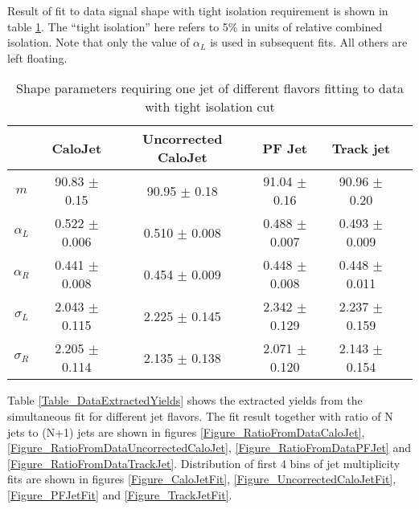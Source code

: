 \documentclass{cmspaper}
\begin{document}

Result of fit to data signal shape with tight isolation requirement is shown in table \ref{Table_DataAlphaL}.
The ``tight isolation'' here refers to 5\% in units of relative combined isolation.
Note that only the value of $\alpha_L$ is used in subsequent fits.  All others are left floating.

\begin{table}[htbp]
\caption{Shape parameters requiring one jet of different flavors fitting to data with tight isolation cut}
\centering
   \begin{tabular}{|c|c|c|c|c|c|}
      \hline
      & CaloJet & Uncorrected CaloJet & PF Jet & Track jet \\\hline
      $m$ & 90.83 $\pm$ 0.15 & 90.95 $\pm$ 0.18 & 91.04 $\pm$ 0.16 & 90.96 $\pm$ 0.20 \\\hline
      $\alpha_L$ & 0.522 $\pm$ 0.006 & 0.510 $\pm$ 0.008 & 0.488 $\pm$ 0.007 & 0.493 $\pm$ 0.009 \\\hline
      $\alpha_R$ & 0.441 $\pm$ 0.008 & 0.454 $\pm$ 0.009 & 0.448 $\pm$ 0.008 & 0.448 $\pm$ 0.011 \\\hline
      $\sigma_L$ & 2.043 $\pm$ 0.115 & 2.225 $\pm$ 0.145 & 2.342 $\pm$ 0.129 & 2.237 $\pm$ 0.159 \\\hline
      $\sigma_R$ & 2.205 $\pm$ 0.114 & 2.135 $\pm$ 0.138 & 2.071 $\pm$ 0.120 & 2.143 $\pm$ 0.154 \\\hline
   \end{tabular}
   \label{Table_DataAlphaL}
\end{table}

Table \ref{Table_DataExtractedYields} shows the extracted yields from the simultaneous fit for different jet flavors.
The fit result together with ratio of N jets to (N+1) jets are shown in figures
\ref{Figure_RatioFromDataCaloJet}, \ref{Figure_RatioFromDataUncorrectedCaloJet}, \ref{Figure_RatioFromDataPFJet}
and \ref{Figure_RatioFromDataTrackJet}.
Distribution of first 4 bins of jet multiplicity fits are shown in figures \ref{Figure_CaloJetFit}, \ref{Figure_UncorrectedCaloJetFit},
\ref{Figure_PFJetFit} and \ref{Figure_TrackJetFit}.
\end{document}
